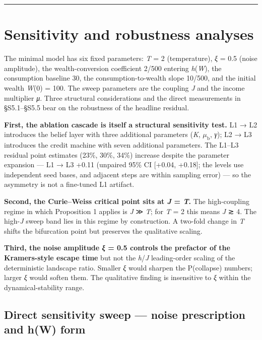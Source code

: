 \documentclass[11pt,letterpaper]{article}
\begin{document}
\begin{center}\rule{0.5\linewidth}{0.5pt}\end{center}

\section{Sensitivity and robustness analyses}\label{sensitivity-and-robustness-analyses}

The minimal model has six fixed parameters: \emph{T} = 2 (temperature), \emph{ξ} = 0.5 (noise amplitude), the wealth-conversion coefficient 2/500 entering \emph{h}(\emph{W}), the consumption baseline 30, the consumption-to-wealth slope 10/500, and the initial wealth \emph{W}(0) = 100. The sweep parameters are the coupling \emph{J} and the income multiplier \emph{μ}. Three structural considerations and the direct measurements in §S5.1--§S5.5 bear on the robustness of the headline residual.

\textbf{First, the ablation cascade is itself a structural sensitivity test.} L1 → L2 introduces the belief layer with three additional parameters (\emph{K}, \(\mu_{\mathrm{b}}\), \emph{γ}); L2 → L3 introduces the credit machine with seven additional parameters. The L1--L3 residual point estimates (23\%, 30\%, 34\%) increase despite the parameter expansion --- L1 → L3 +0.11 (unpaired 95\% CI {[}+0.04, +0.18{]}; the levels use independent seed bases, and adjacent steps are within sampling error) --- so the asymmetry is not a fine-tuned L1 artifact.

\textbf{Second, the Curie--Weiss critical point sits at \emph{J} = \emph{T}.} The high-coupling regime in which Proposition 1 applies is \emph{J} ≫ \emph{T}; for \emph{T} = 2 this means \emph{J} ≳ 4. The high-\emph{J} sweep band lies in this regime by construction. A two-fold change in \emph{T} shifts the bifurcation point but preserves the qualitative scaling.

\textbf{Third, the noise amplitude \emph{ξ} = 0.5 controls the prefactor of the Kramers-style escape time} but not the \emph{h}/\emph{J} leading-order scaling of the deterministic landscape ratio. Smaller \emph{ξ} would sharpen the P(collapse) numbers; larger \emph{ξ} would soften them. The qualitative finding is insensitive to \emph{ξ} within the dynamical-stability range.

\subsection{Direct sensitivity sweep --- noise prescription and h(W) form}\label{direct-sensitivity-sweep-noise-prescription-and-hw-form}
\end{document}
